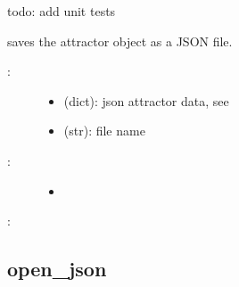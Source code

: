 \documentclass[letterpaper,10pt,english]{sphinxmanual}
\begin{document}
\begin{fulllineitems}
\label{\detokenize{Attractors:PyBoolNet.Attractors.save_json}}
todo: add unit tests

saves the attractor object as a JSON file.
\begin{description}
\item[{:}] \leavevmode\begin{itemize}
\item {} 
 (dict): json attractor data, see {\hyperref[\detokenize{Attractors:attractors-compute-json}]{}}

\item {} 
 (str): file name

\end{itemize}

\item[{:}] \leavevmode\begin{itemize}
\item {} 

\end{itemize}

\end{description}

:

\begin{sphinxVerbatim}[commandchars=\\\{\}]
 
\end{sphinxVerbatim}

\end{fulllineitems}



\subsection{open\_json}
\label{\detokenize{Attractors:open-json}}\label{\detokenize{Attractors:attractors-open-json}}
\end{document}
